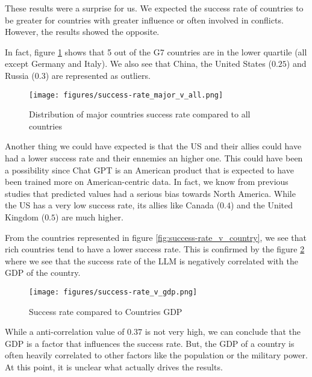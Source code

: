 These results were a surprise for us. We expected the success rate of countries to be greater for countries with greater influence or often involved in conflicts. However, the results showed the opposite.

In fact, figure \ref{fig:success-rate_major_v_all} shows that 5 out of the G7 countries are in the lower quartile (all except Germany and Italy). We also see that China, the United States ($0.25$) and Russia ($0.3$) are represented as outliers.

\begin{figure}[H]
    \texttt{[image: figures/success-rate\_major\_v\_all.png]}
    \caption[Plot of the success rate distribution of major countries compared to the distribution of all countries]{Distribution of major countries success rate compared to all countries}
    \label{fig:success-rate_major_v_all}
\end{figure}

Another thing we could have expected is that the US and their allies could have had a lower success rate and their ennemies an higher one. This could have been a possibility since Chat GPT is an American product that is expected to have been trained more on American-centric data. In fact, we know from previous studies that predicted values had a serious bias towards North America\cite{li-etal-2022-herb}\cite{yu2023largelanguagemodelattributed}. While the US has a very low success rate, its allies like Canada ($0.4$) and the United Kingdom ($0.5$) are much higher.

From the countries represented in figure \ref{fig:success-rate_v_country}, we see that rich countries tend to have a lower success rate. This is confirmed by the figure \ref{fig:success-rate_v_gdp} where we see that the success rate of the LLM is negatively correlated with the GDP of the country.

\begin{figure}[H]
    \texttt{[image: figures/success-rate\_v\_gdp.png]}
    \caption[Plot of success rate of countries based on their GDP]{Success rate compared to Countries GDP \cite{worldbank:gdp}}
    \label{fig:success-rate_v_gdp}
\end{figure}

While a anti-correlation value of $0.37$ is not very high, we can conclude that the GDP is a factor that influences the success rate. But, the GDP of a country is often heavily correlated to other factors like the population or the military power. At this point, it is unclear what actually drives the results.

